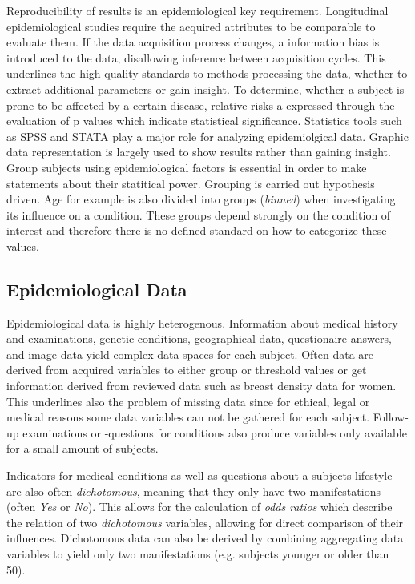\documentclass[journal]{style/vgtc}           %
\begin{document}
Reproducibility of results is an epidemiological key requirement.
%
Longitudinal epidemiological studies require the acquired attributes to be comparable to evaluate them.
%
If the data acquisition process changes, a information bias is introduced to the data, disallowing inference between acquisition cycles.
%
This underlines the high quality standards to methods processing the data, whether to extract additional parameters or gain insight.
%
To determine, whether a subject is prone to be affected by a certain disease, relative risks a expressed through the evaluation of p values which indicate statistical significance.
%
Statistics tools such as SPSS and STATA play a major role for analyzing epidemiolgical data. 
%
Graphic data representation is largely used to show results rather than gaining insight.
\\
Group subjects using epidemiological factors is essential in order to make statements about their statitical power.
%
Grouping is carried out hypothesis driven.
%
Age for example is also divided into groups (\emph{binned}) when investigating its influence on a condition.
%
These groups depend strongly on the condition of interest and therefore there is no defined standard on how to categorize these values.
	
\subsection{Epidemiological Data}
Epidemiological data is highly heterogenous.
%
Information about medical history and examinations, genetic conditions, geographical data, questionaire answers, and image data yield complex data spaces for each subject.
%
Often data are derived from acquired variables to either group or threshold values or get information derived from reviewed data such as breast density data for women.
%
This underlines also the problem of missing data since for ethical, legal or medical reasons some data variables can not be gathered for each subject.
%
Follow-up examinations or -questions for conditions also produce variables only available for a small amount of subjects.
%

Indicators for medical conditions as well as questions about a subjects lifestyle are also often \emph{dichotomous}, meaning that they only have two manifestations (often \emph{Yes} or \emph{No}).
%
This allows for the calculation of \emph{odds ratios} which describe the relation of two \emph{dichotomous} variables, allowing for direct comparison of their influences.
%
Dichotomous data can also be derived by combining aggregating data variables to yield only two manifestations (e.g. subjects younger or older than 50).
%
\end{document}
